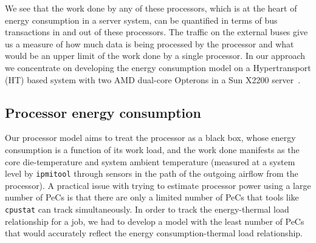 \documentclass[12pt,onecolumn]{ULieeetran}
\begin{document}
We see that the work done by any of these processors, which is at the
heart of energy consumption in a server system, can be quantified in
terms of bus transactions in and out of these processors.  The traffic
on the external buses give us a measure of how much data is being
processed by the processor and what would be an upper limit of the work
done by a single processor. In our approach we concentrate on developing
the energy consumption model on a Hypertransport (HT) based system with
two AMD dual-core Opterons in a Sun X2200 server~\cite{Sun2008a}.

\subsection{ Processor energy consumption}
\label{sec:procmodel}
Our processor model aims to treat the processor as a black box,
whose energy consumption is a function of its work load, and the work
done manifests as the core die-temperature and system ambient
temperature (measured at a system level by \texttt{ipmitool} through
sensors in the path of the outgoing airflow from the processor).  A
practical issue with trying to estimate processor power using a large
number of PeCs is that there are only a limited number  of
PeCs that tools like \texttt{cpustat} can track simultaneously. In
order to track the energy-thermal load relationship for a job, we had to
develop a model with the least number of PeCs that would accurately
reflect the energy consumption-thermal load relationship.
\end{document}
